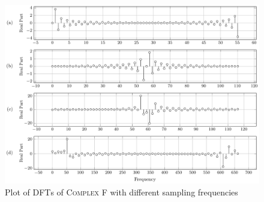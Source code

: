 \documentclass[../../course]{subfiles}
\begin{document}
\begin{figure} [H]
    \centering
     {
        \includegraphics[height = 0.8\textheight] {tikzpics/plotDftComplexF64.pdf}
    }
     {Plot of \textsc{DFT}s of \textsc{Complex F} with different sampling frequencies}
    \label{plt:dftComplexF}
\end{figure}
\end{document}
